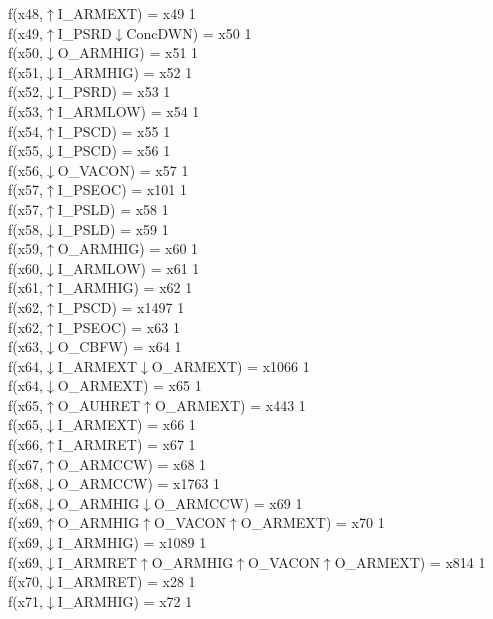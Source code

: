 f(x48,$\uparrow$I\_ARMEXT) = x49 {1} \\
f(x49,$\uparrow$I\_PSRD$\downarrow$ConcDWN) = x50 {1} \\
f(x50,$\downarrow$O\_ARMHIG) = x51 {1} \\
f(x51,$\downarrow$I\_ARMHIG) = x52 {1} \\
f(x52,$\downarrow$I\_PSRD) = x53 {1} \\
f(x53,$\uparrow$I\_ARMLOW) = x54 {1} \\
f(x54,$\uparrow$I\_PSCD) = x55 {1} \\
f(x55,$\downarrow$I\_PSCD) = x56 {1} \\
f(x56,$\downarrow$O\_VACON) = x57 {1} \\
f(x57,$\uparrow$I\_PSEOC) = x101 {1} \\
f(x57,$\uparrow$I\_PSLD) = x58 {1} \\
f(x58,$\downarrow$I\_PSLD) = x59 {1} \\
f(x59,$\uparrow$O\_ARMHIG) = x60 {1} \\
f(x60,$\downarrow$I\_ARMLOW) = x61 {1} \\
f(x61,$\uparrow$I\_ARMHIG) = x62 {1} \\
f(x62,$\uparrow$I\_PSCD) = x1497 {1} \\
f(x62,$\uparrow$I\_PSEOC) = x63 {1} \\
f(x63,$\downarrow$O\_CBFW) = x64 {1} \\
f(x64,$\downarrow$I\_ARMEXT$\downarrow$O\_ARMEXT) = x1066 {1} \\
f(x64,$\downarrow$O\_ARMEXT) = x65 {1} \\
f(x65,$\uparrow$O\_AUHRET$\uparrow$O\_ARMEXT) = x443 {1} \\
f(x65,$\downarrow$I\_ARMEXT) = x66 {1} \\
f(x66,$\uparrow$I\_ARMRET) = x67 {1} \\
f(x67,$\uparrow$O\_ARMCCW) = x68 {1} \\
f(x68,$\downarrow$O\_ARMCCW) = x1763 {1} \\
f(x68,$\downarrow$O\_ARMHIG$\downarrow$O\_ARMCCW) = x69 {1} \\
f(x69,$\uparrow$O\_ARMHIG$\uparrow$O\_VACON$\uparrow$O\_ARMEXT) = x70 {1} \\
f(x69,$\downarrow$I\_ARMHIG) = x1089 {1} \\
f(x69,$\downarrow$I\_ARMRET$\uparrow$O\_ARMHIG$\uparrow$O\_VACON$\uparrow$O\_ARMEXT) = x814 {1} \\
f(x70,$\downarrow$I\_ARMRET) = x28 {1} \\
f(x71,$\downarrow$I\_ARMHIG) = x72 {1} \\
